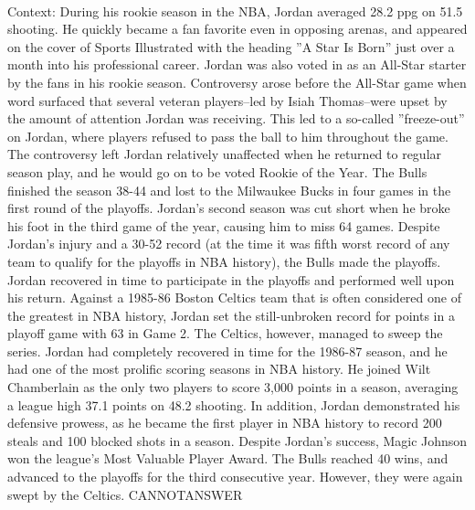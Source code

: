 \documentclass[11pt,a4paper, onecolumn]{article}
\begin{document}
\\ Context: During his rookie season in the NBA, Jordan averaged 28.2 ppg on 51.5  shooting. He quickly became a fan favorite even in opposing arenas, and appeared on the cover of Sports Illustrated with the heading ''A Star Is Born'' just over a month into his professional career. Jordan was also voted in as an All-Star starter by the fans in his rookie season. Controversy arose before the All-Star game when word surfaced that several veteran players--led by Isiah Thomas--were upset by the amount of attention Jordan was receiving. This led to a so-called ''freeze-out'' on Jordan, where players refused to pass the ball to him throughout the game. The controversy left Jordan relatively unaffected when he returned to regular season play, and he would go on to be voted Rookie of the Year. The Bulls finished the season 38-44 and lost to the Milwaukee Bucks in four games in the first round of the playoffs. Jordan's second season was cut short when he broke his foot in the third game of the year, causing him to miss 64 games. Despite Jordan's injury and a 30-52 record (at the time it was fifth worst record of any team to qualify for the playoffs in NBA history), the Bulls made the playoffs. Jordan recovered in time to participate in the playoffs and performed well upon his return. Against a 1985-86 Boston Celtics team that is often considered one of the greatest in NBA history, Jordan set the still-unbroken record for points in a playoff game with 63 in Game 2. The Celtics, however, managed to sweep the series. Jordan had completely recovered in time for the 1986-87 season, and he had one of the most prolific scoring seasons in NBA history. He joined Wilt Chamberlain as the only two players to score 3,000 points in a season, averaging a league high 37.1 points on 48.2  shooting. In addition, Jordan demonstrated his defensive prowess, as he became the first player in NBA history to record 200 steals and 100 blocked shots in a season. Despite Jordan's success, Magic Johnson won the league's Most Valuable Player Award. The Bulls reached 40 wins, and advanced to the playoffs for the third consecutive year. However, they were again swept by the Celtics. CANNOTANSWER
\end{document}
